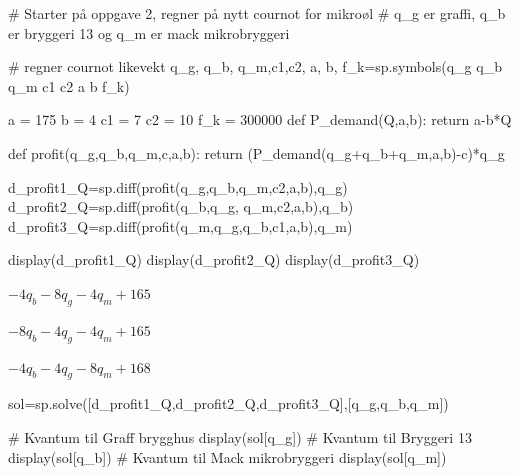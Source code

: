 \documentclass[
  12pt,
  a4paper,
  DIV=11,
  numbers=noendperiod]{scrartcl}
\newenvironment{Shaded}{\begin{snugshade}}{\end{snugshade}}
\newcommand{\CommentTok}[1]{\textcolor[rgb]{0.37,0.37,0.37}{#1}}
\newcommand{\ControlFlowTok}[1]{\textcolor[rgb]{0.00,0.23,0.31}{#1}}
\newcommand{\DecValTok}[1]{\textcolor[rgb]{0.68,0.00,0.00}{#1}}
\newcommand{\KeywordTok}[1]{\textcolor[rgb]{0.00,0.23,0.31}{#1}}
\newcommand{\NormalTok}[1]{\textcolor[rgb]{0.00,0.23,0.31}{#1}}
\newcommand{\OperatorTok}[1]{\textcolor[rgb]{0.37,0.37,0.37}{#1}}
\newcommand{\StringTok}[1]{\textcolor[rgb]{0.13,0.47,0.30}{#1}}
\begin{document}
\begin{Shaded}
\begin{Highlighting}[]
\CommentTok{\# Starter på oppgave 2, regner på nytt cournot for mikroøl}
\CommentTok{\# q\_g er graffi, q\_b er bryggeri 13 og q\_m er mack mikrobryggeri}

\CommentTok{\# regner cournot likevekt}
\NormalTok{q\_g, q\_b, q\_m,c1,c2, a, b, f\_k}\OperatorTok{=}\NormalTok{sp.symbols(}\StringTok{\textquotesingle{}q\_g q\_b q\_m c1 c2 a b f\_k\textquotesingle{}}\NormalTok{)}

\NormalTok{a }\OperatorTok{=} \DecValTok{175}
\NormalTok{b }\OperatorTok{=} \DecValTok{4}
\NormalTok{c1 }\OperatorTok{=} \DecValTok{7}
\NormalTok{c2 }\OperatorTok{=} \DecValTok{10}
\NormalTok{f\_k }\OperatorTok{=} \DecValTok{300000}
\KeywordTok{def}\NormalTok{ P\_demand(Q,a,b):}
    \ControlFlowTok{return}\NormalTok{ a}\OperatorTok{{-}}\NormalTok{b}\OperatorTok{*}\NormalTok{Q}

\KeywordTok{def}\NormalTok{ profit(q\_g,q\_b,q\_m,c,a,b):}
    \ControlFlowTok{return}\NormalTok{ (P\_demand(q\_g}\OperatorTok{+}\NormalTok{q\_b}\OperatorTok{+}\NormalTok{q\_m,a,b)}\OperatorTok{{-}}\NormalTok{c)}\OperatorTok{*}\NormalTok{q\_g}
\end{Highlighting}
\end{Shaded}

\begin{Shaded}
\begin{Highlighting}[]
\NormalTok{d\_profit1\_Q}\OperatorTok{=}\NormalTok{sp.diff(profit(q\_g,q\_b,q\_m,c2,a,b),q\_g)}
\NormalTok{d\_profit2\_Q}\OperatorTok{=}\NormalTok{sp.diff(profit(q\_b,q\_g, q\_m,c2,a,b),q\_b)}
\NormalTok{d\_profit3\_Q}\OperatorTok{=}\NormalTok{sp.diff(profit(q\_m,q\_g,q\_b,c1,a,b),q\_m)}


\NormalTok{display(d\_profit1\_Q)}
\NormalTok{display(d\_profit2\_Q)}
\NormalTok{display(d\_profit3\_Q)}
\end{Highlighting}
\end{Shaded}

$\displaystyle - 4 q_{b} - 8 q_{g} - 4 q_{m} + 165$

$\displaystyle - 8 q_{b} - 4 q_{g} - 4 q_{m} + 165$

$\displaystyle - 4 q_{b} - 4 q_{g} - 8 q_{m} + 168$

\begin{Shaded}
\begin{Highlighting}[]
\NormalTok{sol}\OperatorTok{=}\NormalTok{sp.solve([d\_profit1\_Q,d\_profit2\_Q,d\_profit3\_Q],[q\_g,q\_b,q\_m])}

\CommentTok{\# Kvantum til Graff brygghus}
\NormalTok{display(sol[q\_g])}
\CommentTok{\# Kvantum til Bryggeri 13}
\NormalTok{display(sol[q\_b])}
\CommentTok{\# Kvantum til Mack mikrobryggeri}
\NormalTok{display(sol[q\_m])}
\end{Highlighting}
\end{Shaded}
\end{document}
